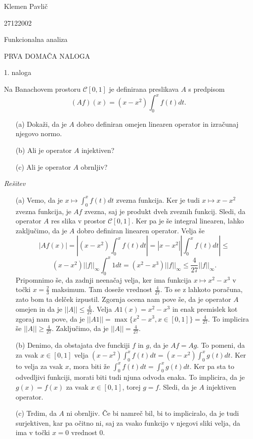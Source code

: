 \documentclass[a4paper, 12pt]{article}
\begin{document}
\begin{flushright}
Klemen Pavlič

27122002
\end{flushright}
\begin{center}
Funkcionalna analiza
\end{center}
\begin{center}
PRVA DOMAČA NALOGA
\end{center}

\begin{flushleft}
1. naloga
\end{flushleft}
Na Banachovem prostoru $\mathcal{C}[0,1]$ je definirana preslikava $A$ s predpisom
$$
(Af)(x) = (x-x^2) \int_{0}^x f(t) dt.
$$
\begin{enumerate}
\item[(a)] Dokaži, da je $A$ dobro definiran omejen linearen operator in izračunaj njegovo normo.
\item[(b)] Ali je operator $A$ injektiven?
\item[(c)] Ali je operator $A$ obrnljiv?
\end{enumerate}
\emph{Rešitev}
\begin{enumerate}
\item[(a)]Vemo, da je  $x\mapsto \int_0^x f(t)dt$ zvezna funkcija. Ker je tudi $x\mapsto x-x^2$ zvezna funkcija, je $Af$ zvezna, saj je produkt dveh zveznih funkcij. Sledi, da operator $A$ res slika v prostor $\mathcal{C}[0,1]$. Ker pa je še integral linearen, lahko zaključimo, da je $A$ dobro definiran linearen operator. Velja še 
$$
|Af(x)| = |(x-x^2)\int_0^x f(t)dt| = |x-x^2| |\int_0^x f(t)dt| \le
$$
$$
(x-x^2)||f||_{\infty} \int_0^x 1 dt= (x^2 - x^3) ||f||_{\infty} \le \frac{4}{27} ||f||_{\infty}.
$$
Pripomnimo še, da zadnji neenačaj velja, ker ima funkcija $x\mapsto x^2 - x^3$ v točki $x=\frac{2}{3}$ maksimum. Tam doseže vrednost $\frac{4}{27}$. To se z lahkoto poračuna, zato bom ta delček izpustil.
 Zgornja ocena nam pove še, da je operator $A$ omejen in da je $||A|| \le \frac{4}{27}$. Velja $A1(x) = x^2 - x^3$ in enak premislek kot zgoraj nam pove, da je $||A1|| = \max\{x^2 - x^3, x\in[0,1]\}=\frac{4}{27}$. To implicira še $||A||\ge \frac{4}{27}$. Zaključimo, da je $||A||=\frac{4}{27}$.

\item[(b)] Denimo, da obstajata dve funckiji $f$ in $g$, da je $Af = Ag$. To pomeni, da za vsak $x\in [0,1]$ velja $(x-x^2) \int_0^x f(t)dt = (x-x^2) \int_0^xg(t)dt$. Ker to velja za vsak $x$, mora biti že $\int_0^x f(t)dt = \int_0^x g(t)dt$. Ker pa sta to odvedljivi funkciji, morati biti tudi njuna odvoda enaka. To implicira, da je $g(x) = f(x)$ za vsak $x\in[0,1]$, torej $g=f$. Sledi, da je $A$ injektiven operator.

\item[(c)] Trdim, da $A$ ni obrnljiv. Če bi namreč bil, bi to impliciralo, da je tudi surjektiven, kar pa očitno ni, saj za vsako funkcijo v njegovi sliki velja, da ima v točki $x=0$ vrednost 0.
\end{enumerate}
\end{document}

